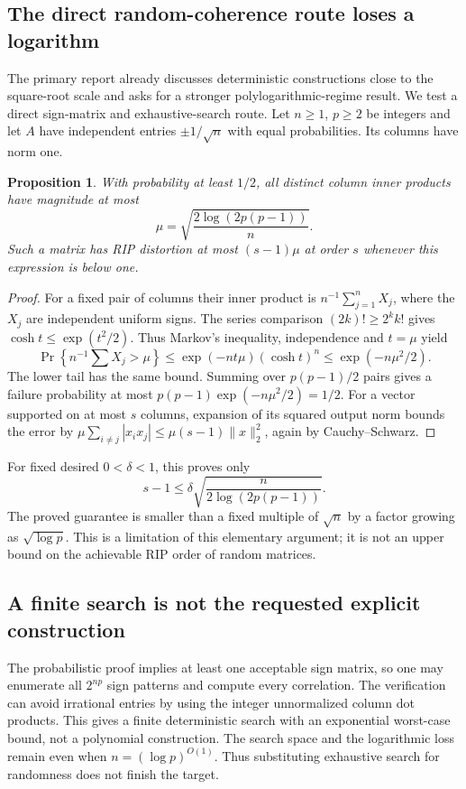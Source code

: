 \documentclass[11pt]{article}
\newtheorem{proposition}{Proposition}
\begin{document}
\subsection{The direct random-coherence route loses a logarithm}
The primary report already discusses deterministic constructions close to the square-root scale and asks for a stronger polylogarithmic-regime result. We test a direct sign-matrix and exhaustive-search route. Let $n\ge1$, $p\ge2$ be integers and let $A$ have independent entries $\pm1/\sqrt n$ with equal probabilities. Its columns have norm one.
\begin{proposition}
With probability at least $1/2$, all distinct column inner products have magnitude at most
\[
\mu=\sqrt{\frac{2\log(2p(p-1))}{n}}.
\]
Such a matrix has RIP distortion at most $(s-1)\mu$ at order $s$ whenever this expression is below one.
\end{proposition}
\begin{proof}
For a fixed pair of columns their inner product is $n^{-1}\sum_{j=1}^n X_j$, where the $X_j$ are independent uniform signs. The series comparison $(2k)!\ge2^k k!$ gives $\cosh t\le\exp(t^2/2)$. Thus Markov's inequality, independence and $t=\mu$ yield
\[
\Pr\left\{n^{-1}\sum X_j>\mu\right\}
\le\exp(-nt\mu)(\cosh t)^n\le\exp(-n\mu^2/2).
\]
The lower tail has the same bound. Summing over $p(p-1)/2$ pairs gives a failure probability at most $p(p-1)\exp(-n\mu^2/2)=1/2$. For a vector supported on at most $s$ columns, expansion of its squared output norm bounds the error by $\mu\sum_{i\ne j}|x_ix_j|\le\mu(s-1)\|x\|_2^2$, again by Cauchy--Schwarz.
\end{proof}
For fixed desired $0<\delta<1$, this proves only
\[
s-1\le\delta\sqrt{\frac{n}{2\log(2p(p-1))}}.
\]
The proved guarantee is smaller than a fixed multiple of $\sqrt n$ by a factor growing as $\sqrt{\log p}$. This is a limitation of this elementary argument; it is not an upper bound on the achievable RIP order of random matrices.
\subsection{A finite search is not the requested explicit construction}
The probabilistic proof implies at least one acceptable sign matrix, so one may enumerate all $2^{np}$ sign patterns and compute every correlation. The verification can avoid irrational entries by using the integer unnormalized column dot products. This gives a finite deterministic search with an exponential worst-case bound, not a polynomial construction. The search space and the logarithmic loss remain even when $n=(\log p)^{O(1)}$. Thus substituting exhaustive search for randomness does not finish the target.
\end{document}

